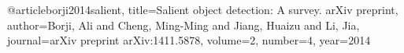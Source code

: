 @article{borji2014salient,
  title={Salient object detection: A survey. arXiv preprint},
  author={Borji, Ali and Cheng, Ming-Ming and Jiang, Huaizu and Li, Jia},
  journal={arXiv preprint arXiv:1411.5878},
  volume={2},
  number={4},
  year={2014}
}